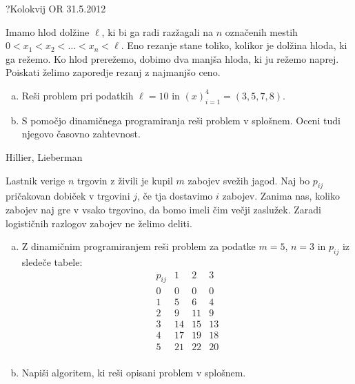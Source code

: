 \begin{naloga}{?}{Kolokvij OR 31.5.2012}
\begin{vprasanje}
Imamo hlod dolžine $\ell$,
ki bi ga radi razžagali na $n$ označenih mestih
$0 < x_1 < x_2 < \dots < x_n < \ell$.
Eno rezanje stane toliko, kolikor je dolžina hloda, ki ga režemo.
Ko hlod prerežemo, dobimo dva manjša hloda, ki ju režemo naprej.
Poiskati želimo zaporedje rezanj z najmanjšo ceno.
\begin{enumerate}[(a)]
\item Reši problem pri podatkih $\ell = 10$ in $(x)_{i=1}^4 = (3, 5, 7, 8)$.
\item S pomočjo dinamičnega programiranja reši problem v splošnem.
Oceni tudi njegovo časovno zahtevnost.
\end{enumerate}

\end{vprasanje}
\begin{odgovor}
\end{odgovor}
\end{naloga}


\begin{naloga}{Hillier, Lieberman}{\cite[Problem~11.3-1]{hl}}
\begin{vprasanje}
Lastnik verige $n$ trgovin z živili je kupil $m$ zabojev svežih jagod.
Naj bo $p_{ij}$ pričakovan dobiček v trgovini $j$,
če tja dostavimo $i$ zabojev.
Zanima nas, koliko zabojev naj gre v vsako trgovino,
da bomo imeli čim večji zaslužek.
Zaradi logističnih razlogov zabojev ne želimo deliti.
\begin{enumerate}[(a)]
\item Z dinamičnim programiranjem reši problem za podatke $m = 5$, $n = 3$
in $p_{ij}$ iz sledeče tabele:
$$
\begin{array}{c|ccc}
p_{ij} & 1 & 2 & 3 \\
\hline
0 &  0 &  0 &  0 \\
1 &  5 &  6 &  4 \\
2 &  9 & 11 &  9 \\
3 & 14 & 15 & 13 \\
4 & 17 & 19 & 18 \\
5 & 21 & 22 & 20 \\
\end{array}
$$
\item Napiši algoritem, ki reši opisani problem v splošnem.
\end{enumerate}

\end{vprasanje}
\begin{odgovor}
\end{odgovor}
\end{naloga}


